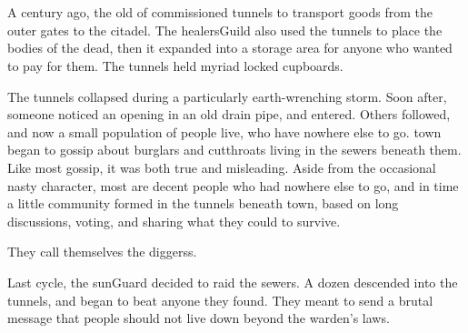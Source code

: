 \section{}
\label{sewers}


\begin{multicols}{2}

\begin{exampletext}
  \noindent
  A century ago, the old  of  commissioned tunnels to transport goods from the outer gates to the citadel.
  The \gls{healersGuild} also used the tunnels to place the bodies of the dead, then it expanded into a storage area for anyone who wanted to pay for them.
  The tunnels held myriad locked cupboards.


  The tunnels collapsed during a particularly earth-wrenching \gls{storm}.
  Soon after, someone noticed an opening in an old drain pipe, and entered.
  Others followed, and now a small population of people live, who have nowhere else to go.
  \Gls{town} began to gossip about burglars and cutthroats living in the sewers beneath them.
  Like most gossip, it was both true and misleading.
  Aside from the occasional nasty character, most are decent people who had nowhere else to go, and in time a little community formed in the tunnels beneath \gls{town}, based on long discussions, voting, and sharing what they could to survive.

  They call themselves the \glspl{diggers}.
\end{exampletext}

\begin{exampletext}
  \label{guardAttackHistory}
  Last \gls{cycle}, the \gls{sunGuard} decided to raid the sewers.
  A dozen descended into the tunnels, and began to beat anyone they found.
  They meant to send a brutal message that people should not live down beyond the \gls{warden}'s laws.


\end{exampletext}
\end{multicols}
